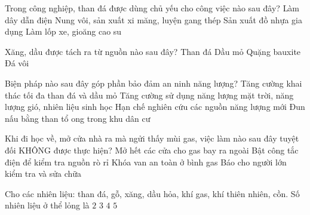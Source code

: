 \documentclass[Main.tex]{subfiles}
\begin{document}
\begin{ex}%
	Trong công nghiệp, than đá được dùng chủ yếu cho công việc nào sau đây?
	\choice
	{Làm dây dẫn điện}
	{\True Nung vôi, sản xuất xi măng, luyện gang thép}
	{Sản xuất đồ nhựa gia dụng}
	{Làm lốp xe, gioăng cao su}
\end{ex}

\begin{ex}%
	Xăng, dầu được tách ra từ nguồn nào sau đây?
	\choice
	{Than đá}
	{\True Dầu mỏ}
	{Quặng bauxite}
	{Đá vôi}
\end{ex}

\begin{ex}%
	Biện pháp nào sau đây góp phần bảo đảm an ninh năng lượng?
	\choice
	{Tăng cường khai thác tối đa than đá và dầu mỏ}
	{\True Tăng cường sử dụng năng lượng mặt trời, năng lượng gió, nhiên liệu sinh học}
	{Hạn chế nghiên cứu các nguồn năng lượng mới}
	{Đun nấu bằng than tổ ong trong khu dân cư}
\end{ex}

\begin{ex}%
	Khi đi học về, mở cửa nhà ra mà ngửi thấy mùi gas, việc làm nào sau đây tuyệt đối KHÔNG được thực hiện?
	\choice
	{Mở hết các cửa cho gas bay ra ngoài}
	{\True Bật công tắc điện để kiểm tra nguồn rò rỉ}
	{Khóa van an toàn ở bình gas}
	{Báo cho người lớn kiểm tra và sửa chữa}
\end{ex}

\begin{ex}%
	Cho các nhiên liệu: than đá, gỗ, xăng, dầu hỏa, khí gas, khí thiên nhiên, cồn. Số nhiên liệu ở thể lỏng là
	\choice
	{$2$}
	{\True $3$}
	{$4$}
	{$5$}
\end{ex}
\end{document}
